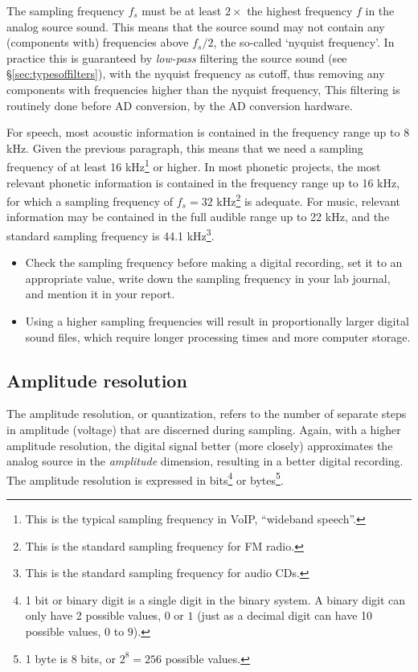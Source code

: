 \documentclass[
]{book}
\begin{document}
\label{nyquist}
The sampling frequency \(f_s\) must be at least \(2 \times\) the highest frequency \(f\) in the analog source sound. This means that the source sound may not contain any (components with) frequencies above \(f_s / 2\), the so-called `nyquist frequency'. In practice this is guaranteed by \emph{low-pass} filtering the source sound (see §\ref{sec:typesoffilters}), with the nyquist frequency as cutoff, thus removing any components with frequencies higher than the nyquist frequency, This filtering is routinely done before AD conversion, by the AD conversion hardware.

For speech, most acoustic information is contained in the frequency range up to 8 kHz. Given the previous paragraph, this means that we need a sampling frequency of at least 16 kHz\footnote{This is the typical sampling frequency in VoIP, ``wideband speech''.} or higher. In most phonetic projects, the most relevant phonetic information is contained in the frequency range up to 16 kHz, for which a sampling frequency of \(f_s = 32\) kHz\footnote{This is the standard sampling frequency for FM radio.} is adequate.
For music, relevant information may be contained in the full audible range up to 22 kHz, and the standard sampling frequency is 44.1 kHz\footnote{This is the standard sampling frequency for audio CDs.}.

\begin{itemize}
\item
  Check the sampling frequency before making a digital recording, set it to an appropriate value, write down the sampling frequency in your lab journal, and mention it in your report.
\item
  Using a higher sampling frequencies will result in proportionally larger digital sound files, which require longer processing times and more computer storage.
\end{itemize}

\subsection{Amplitude resolution}\label{amplitude-resolution}

The amplitude resolution, or quantization, refers to the number of separate steps in amplitude (voltage) that are discerned during sampling. Again, with a higher amplitude resolution, the digital signal better (more closely) approximates the analog source in the \emph{amplitude} dimension, resulting in a better digital recording. The amplitude resolution is expressed in bits\footnote{1 bit or binary digit is a single digit in the binary system. A binary digit can only have 2 possible values, \(0\) or \(1\) (just as a decimal digit can have 10 possible values, \(0\) to \(9\)).} or bytes\footnote{1 byte is 8 bits, or \(2^8=256\) possible values.}.
\end{document}
